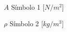 \begin{simbolos}	
	\item[$A$]			Símbolo 1  							[$N/m^2$]
	\item[$\rho$] 		Símbolo 2 							[$kg/m^3$]
\end{simbolos}
